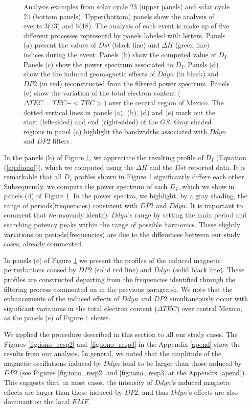 \documentclass[a4paper,fleqn]{cas-dc}
\begin{document}
\begin{figure}[h!]
    
	\caption{Analysis examples from solar cycle 23 (upper panels) and solar cycle 24 (bottom panels). Upper(bottom) panels show the analysis of events 3(13) and 6(18). The analysis of each event is make up of five different processes representd by panels labeled with letters. Panels (a) present the values of $Dst$ (black line) and $\Delta H$ (green line) indices during the event. Panels (b) show the computed value of $D_I$. Panels (c) show the power spectrum associated to $D_I$. Panels (d) show the the induced geomagnetic effects of $Ddyn$ (in black) and $DP2$ (in red) reconstructed from the filtered power spectrum. Panels (e) show the variation of the total electron content ($\Delta TEC = TEC - <TEC>$) over the central region of Mexico. The dotted vertical lines in panels (a), (b), (d) and (e) mark out the start (left-sided) and end (right-sided) of the $GS$. Gray shaded regions in panel (c) highlight the bandwidths associated with $Ddyn$ and $DP2$ filters.}
	\label{fig:iono_resp}
\end{figure}


In the panels (b) of Figure \ref{fig:iono_resp}, we appreciate the resulting profile of $D_I$ (Equation (\ref{eq:diono})), which we computed using the $\Delta {H}$ and the $Dst$ reported data. It is remarkable that all $D_I$ profiles shown in Figure \ref{fig:iono_resp} significantly differe each other. Subsequently, we compute the power spectrum of each $D_I$, which we show in panels (d) of Figure \ref{fig:iono_resp}. In the power spectra, we highlight, by a gray shading, the range of periods(frequencies) consistent with $DP2$ and $Ddyn$. It is important to comment that we manualy identify $Ddyn$'s range by setting the main period and searching potency peaks within the range of possible harmonics. These slightly variations on periods(frequencies) are due to the differences between our study cases, already commented.

In panels (c) of Figure \ref{fig:iono_resp} we present the profiles of the induced magnetic perturbations caused by $DP2$ (solid red line) and $Ddyn$ (solid black line). These profiles are constructed departing from the frequencies identified through the filtering process commented on in the previous paragraph. We note that the enhancements of the induced effects of $Ddyn$ and $DP2$ simultaneously occur with significant variations in the total electron content ($\Delta TEC$) over central Mexico, as the panels (e) of Figure \ref{fig:iono_resp} shows.

We applied the procedure described in this section to all our study cases. The Figures \ref{fig:iono_resp2} and \ref{fig:iono_resp3} in the Appendix \ref{apend} show the results from our analysis. In general, we noted that the amplitude of the magnetic oscillations induced by $Ddyn$ tend to be larger than those induced by $DP2$ (see Figures \ref{fig:iono_resp2} and \ref{fig:iono_resp3} at the Appendix  \ref{apend}). This suggests that, in most cases, the intensity of $Ddyn$'s induced magnetic effects are larger than those induced by $DP2$, and thus $Ddyn$'s effects are also dominant on the local $EMF$.
\end{document}
